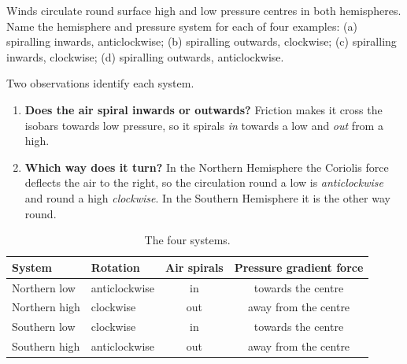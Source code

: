 \begin{questionbox}
Winds circulate round surface high and low pressure centres in both hemispheres. Name the hemisphere and pressure system for each of four examples: (a) spiralling inwards, anticlockwise; (b) spiralling outwards, clockwise; (c) spiralling inwards, clockwise; (d) spiralling outwards, anticlockwise.
\end{questionbox}

Two observations identify each system.
\begin{enumerate}[label=\textbf{\arabic*.},leftmargin=*,itemsep=2pt]
\item \textbf{Does the air spiral inwards or outwards?} Friction makes it cross the isobars towards low pressure, so it spirals \emph{in} towards a low and \emph{out} from a high.
\item \textbf{Which way does it turn?} In the Northern Hemisphere the Coriolis force deflects the air to the right, so the circulation round a low is \emph{anticlockwise} and round a high \emph{clockwise}. In the Southern Hemisphere it is the other way round.
\end{enumerate}

\begin{table}[ht]
\centering
\caption{The four systems.}
\begin{tabular}{llcc}
\toprule
\textbf{System} & \textbf{Rotation} & \textbf{Air spirals} & \textbf{Pressure gradient force}\\
\midrule
Northern low & anticlockwise & in & towards the centre\\
Northern high & clockwise & out & away from the centre\\
Southern low & clockwise & in & towards the centre\\
Southern high & anticlockwise & out & away from the centre\\
\bottomrule
\end{tabular}
\end{table}

